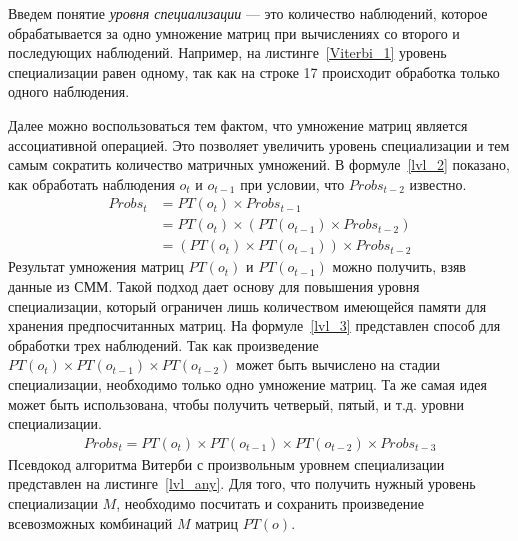 Введем понятие \emph{уровня специализации} --- это количество 
наблюдений, которое обрабатывается за одно умножение матриц 
при вычислениях со второго и последующих наблюдений.
Например, на листинге~\ref{Viterbi_1} уровень специализации 
равен одному, так как на строке 17 происходит обработка 
только одного наблюдения.

Далее можно воспользоваться тем фактом, что умножение матриц 
является ассоциативной операцией.
Это позволяет увеличить уровень специализации и тем самым 
сократить количество матричных умножений.
В формуле~\ref{lvl_2} показано, как обработать наблюдения $o_{t}$ и $o_{t-1}$ при условии, 
что $Probs_{t-2}$ известно.
\begin{align}
  \mathit{Probs}_{t} &= \mathit{PT}(\mathit{o}_{t}) \times \mathit{Probs}_{t-1}\nonumber\\
  &= \mathit{PT}(\mathit{o}_{t}) \times (\mathit{PT}(\mathit{o}_{t-1}) \times \mathit{Probs}_{t-2}) \nonumber\\
  & =(\mathit{PT}(\mathit{o}_{t}) \times \mathit{PT}(\mathit{o}_{t-1})) \times \mathit{Probs}_{t-2}
\label{lvl_2}
\end{align}
Результат умножения матриц $PT(o_t)$ и $PT(o_{t-1})$
можно получить, взяв данные из СММ.
Такой подход дает основу для повышения уровня специализации, 
который ограничен лишь количеством имеющейся памяти для хранения предпосчитанных матриц.
На формуле~\ref{lvl_3} представлен способ для обработки трех 
наблюдений.
Так как произведение $\mathit{PT}(o_t) \times \mathit{PT}(o_{t-1}) \times \mathit{PT}(o_{t-2})$
может быть вычислено на стадии специализации, необходимо 
только одно умножение матриц.
Та же самая идея может быть использована, чтобы получить 
четверый, пятый, и т.д. уровни специализации.
\begin{align}
  \mathit{Probs}_{t} = \mathit{PT}(o_t) \times \mathit{PT}(o_{t-1}) \times \mathit{PT}(o_{t-2}) \times \mathit{Probs}_{t - 3} 
\label{lvl_3}
\end{align}
Псевдокод алгоритма Витерби с произвольным уровнем 
специализации представлен на листинге~\ref{lvl_any}.
Для того, что получить нужный уровень специализации $M$, 
необходимо посчитать и сохранить произведение всевозможных 
комбинаций $M$ матриц $PT(o)$.
